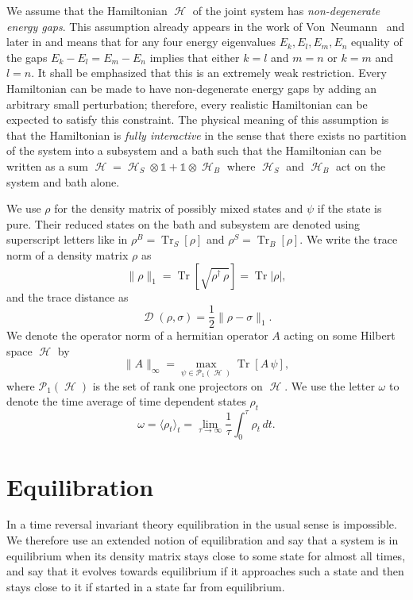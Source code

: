 \documentclass[aps,prl,twocolumn,showpacs,showkeys,a4paper]{revtex4}
\DeclareMathOperator{\Tr}{\mathrm{Tr}}%
\DeclareMathOperator{\tracedistance}{\mathcal{D}}
\DeclareMathOperator{\hiH}{\mathcal{H}}%
\DeclareMathOperator{\haH}{\mathscr{H}}%
\newcommand{\expect}[1]{\langle #1\rangle}
\begin{document}
We assume that the Hamiltonian $\haH$ of the joint system has \emph{non-degenerate energy gaps}.
This assumption already appears in the work of Von~Neumann~\cite{vonneumann1929} and later in \cite{Linden09,Reimann08,0907.0108v1} and means that for any four energy eigenvalues $E_k,E_l,E_m,E_n$ equality of the gaps $E_k - E_l = E_m - E_n$ implies that either $k=l$ and $m=n$ or $k=m$ and $l=n$.
It shall be emphasized that this is an extremely weak restriction.
Every Hamiltonian can be made to have non-degenerate energy gaps by adding an arbitrary small perturbation; therefore, every realistic Hamiltonian can be expected to satisfy this constraint.
The physical meaning of this assumption is that the Hamiltonian is \emph{fully interactive} in the sense that there exists no partition of the system into a subsystem and a bath such that the Hamiltonian can be written as a sum $\haH = \haH_S \otimes \mathds{1} + \mathds{1} \otimes \haH_B$ where $\haH_S$ and $\haH_B$ act on the system and bath alone.

We use $\rho$ for the density matrix of possibly mixed states and $\psi$ if the state is pure.
Their reduced states on the bath and subsystem are denoted using superscript letters like in $\rho^B =\Tr_S[\rho]$ and $\rho^S =\Tr_B[\rho]$.
We write the trace norm of a density matrix $\rho$ as
\begin{equation}
  \|\rho\|_1 = \Tr[\sqrt{\rho^\dagger\,\rho}] = \Tr|\rho| ,
\end{equation}
and the trace distance as
\begin{equation}
  \label{eq:definitiontracedistance}
  \tracedistance(\rho,\sigma) = \frac{1}{2} \|\rho -\sigma \|_1 .
\end{equation}
We denote the operator norm of a hermitian operator $A$ acting on some Hilbert space $\hiH$ by
\begin{equation}
  \|A\|_\infty = \max_{\psi \in \mathcal{P}_1(\hiH)} \Tr[A\,\psi] ,
\end{equation}
where $\mathcal{P}_1(\hiH)$ is the set of rank one projectors on $\hiH$.
We use the letter $\omega$ to denote the time average of time dependent states $\rho_t$
\begin{equation}
  \omega = \expect{\rho_t}_t = \lim_{\tau\to\infty} \frac{1}{\tau} \int_0^\tau \rho_t\,dt .
\end{equation}

\section{Equilibration}
\label{sec:equilibration}
% 
In a time reversal invariant theory equilibration in the usual sense is impossible.
We therefore use an extended notion of equilibration and say that a system is in equilibrium when its density matrix stays close to some state for almost all times, and say that it evolves towards equilibrium if it approaches such a state and then stays close to it if started in a state far from equilibrium.
\end{document}
